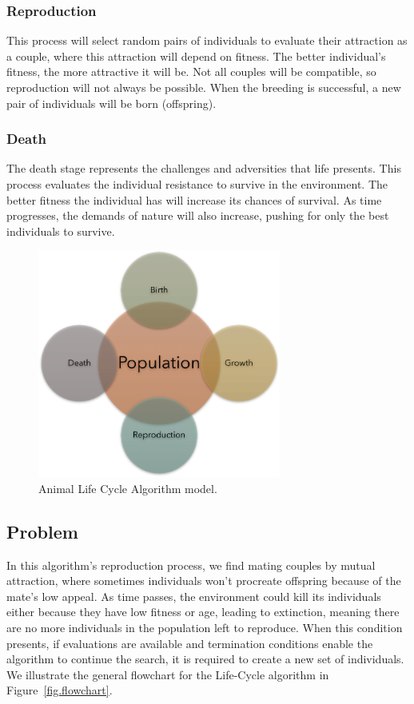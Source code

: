 \documentclass[graybox]{svmult}
\begin{document}
        \subsubsection{Reproduction} This process will select random pairs of
        individuals to evaluate their attraction as a couple, where this attraction
        will depend on fitness. The better individual's fitness, the more attractive it
        will be. Not all couples will be compatible, so reproduction will not always be
        possible. When the breeding is successful, a new pair of individuals will be
        born (offspring).

        \subsubsection{Death} The death stage represents the challenges and adversities
        that life presents. This process evaluates the individual resistance to survive
        in the environment. The better fitness the individual has will increase its
        chances of survival. As time progresses, the demands of nature will also
        increase, pushing for only the best individuals to survive.

        \begin{figure}
            \centering
            \includegraphics[width=80mm]{img/fig_algorithm_model.pdf}
            \caption{Animal Life Cycle Algorithm model.} \label{fig.algorithm_model}
            \end{figure}

    \subsection{Problem}

        In this algorithm's reproduction process, we find mating couples by mutual
        attraction, where sometimes individuals won't procreate offspring because of
        the mate's low appeal. As time passes, the environment could kill its
        individuals either because they have low fitness or age, leading to extinction,
        meaning there are no more individuals in the population left to reproduce. When
        this condition presents, if evaluations are available and termination
        conditions enable the algorithm to continue the search, it is required to
        create a new set of individuals. We illustrate the general flowchart for the
        Life-Cycle algorithm in Figure~\ref{fig.flowchart}.
\end{document}
